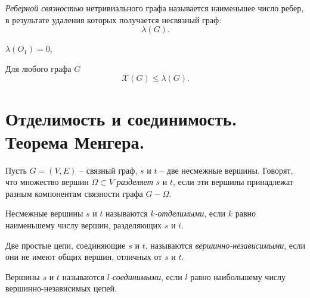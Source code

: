 \begin{definition}
    \emph{Реберной связностью} нетривиального графа называется наименьшее число ребер, в результате удаления которых получается несвязный граф:
    \[
        \lambda(G).
    \]
\end{definition}

\begin{example}
    $ \lambda(O_1) = 0 $,
    \begin{figure}[H]
        \centering
        \label{fig:fig_28}
    \end{figure}
\end{example}

\begin{theorem}
    Для любого графа $ G $
    \[
        \mathcal{X}(G) \leqslant \lambda(G).
    \]
\end{theorem}

\section{Отделимость и соединимость. Теорема Менгера.}

\begin{definition}
    Пусть $ G = (V,E) $ -- связный граф, $ s $ и $ t $ -- две несмежные вершины. Говорят, что множество вершин $ \Omega \subset V $ \emph{разделяет} $ s $ и $ t $, если эти вершины принадлежат разным компонентам связности графа $ G - \Omega $.
\end{definition}

\begin{definition}
    Несмежные вершины $ s $ и $ t $ называются \emph{$ k $-отделимыми}, если $ k $ равно наименьшему числу вершин, разделяющих $ s $ и $ t $.
\end{definition}

\begin{definition}
    Две простые цепи, соединяющие $ s $ и $ t $, называются \emph{вершинно-независимыми}, если они не имеют общих вершин, отличных от $ s $ и $ t $.
\end{definition}

\begin{definition}
    Вершины $ s $ и $ t $ называются \emph{$ l $-соединимыми}, если $ l $ равно наибольшему числу вершинно-независимых цепей.
\end{definition}

